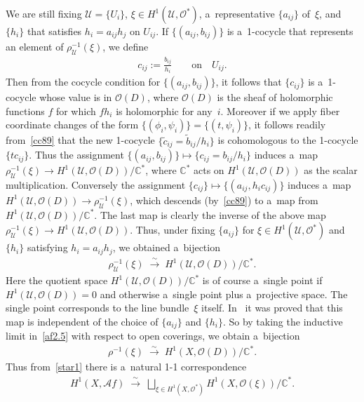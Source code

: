 We are still f\/ixing $\mathscr U=\{U_i\}$, $\xi \in H^1(\mathscr U,\mathscr O^*)$, a~representative $\{a_{ij}\}$ of~$\xi$,
and $\{h_i\}$ that satisf\/ies $h_i=a_{ij}h_j$ on $U_{ij}$.
If $\{(a_{ij},b_{ij})\}$ is a~1-cocycle that represents an element of $\rho^{-1}_{\mathscr U}(\xi)$, we def\/ine
\begin{gather*}
c_{ij}:= \frac{b_{ij}}{h_i}
\qquad
\text{on}
\quad
U_{ij}.
\end{gather*}
Then from the cocycle condition for $\{(a_{ij},b_{ij})\}$, it follows that $\{c_{ij}\}$ is a~1-cocycle whose value is in
$\mathscr O(D)$, where $\mathscr O(D)$ is the sheaf of holomorphic functions $f$ for which $fh_i$ is holomorphic for any~$i$.
Moreover if we apply f\/iber coordinate changes of the form $\{(\phi_i,\psi_i)\}=\{(t,\psi_i)\}$, it follows readily
from~\eqref{cc89} that the new 1-cocycle $\{\tilde c_{ij} = \tilde b_{ij}/h_i\}$ is cohomologous to the 1-cocycle
$\{tc_{ij}\}$.
Thus the assignment $\{(a_{ij},b_{ij})\} \mapsto \{c_{ij}=b_{ij}/h_i\}$ induces a~map $\rho_{\mathscr U}^{-1}(\xi)\to
H^1(\mathscr U,\mathscr O(D))/\mathbb{C}^*$, where $\mathbb{C}^*$ acts on $H^1(\mathscr U,\mathscr O(D))$ as the scalar
multiplication.
Conversely the assignment $\{c_{ij}\}\mapsto \{(a_{ij},h_ic_{ij})\}$ induces a~map $H^1(\mathscr U,\mathscr O(D))\to
\rho_{\mathscr U}^{-1}(\xi)$, which descends (by~\eqref{cc89}) to a~map from $H^1(\mathscr U,\mathscr
O(D))/\mathbb{C}^*$.
The last map is clearly the inverse of the above map $\rho_{\mathscr U}^{-1}(\xi)\to H^1(\mathscr U,\mathscr O(D))$.
Thus, under f\/ixing $\{a_{ij}\}$ for $\xi\in H^1(\mathscr U,\mathscr O^*)$ and $\{h_i\}$ satisfying $h_i = a_{ij}h_j$,
we obtained a~bijection
\begin{gather}
\label{af2.5}
\rho_{\mathscr U}^{-1}(\xi)
\; \stackrel{\sim}{\longrightarrow}
\;
H^1(\mathscr U,\mathscr O(D))/\mathbb{C}^*.
\end{gather}
Here the quotient space $H^1(\mathscr U,\mathscr O(D))/\mathbb{C}^*$ is of course a~single point if $H^1(\mathscr
U,\mathscr O(D))=0$ and otherwise a~single point plus a~projective space.
The single point corresponds to the line bundle~$\xi$ itself.
In~\cite{At55} it was proved that this map is independent of the choice of $\{a_{ij}\}$ and $\{h_i\}$.
So by taking the inductive limit in~\eqref{af2.5} with respect to open coverings, we obtain a~bijection
\begin{gather*}%
\rho^{-1}(\xi)
\;\stackrel{\sim}{\longrightarrow}
\;
H^1(X,\mathscr O(D))/\mathbb{C}^*.
\end{gather*}
Thus from~\eqref{star1} there is a~natural 1-1 correspondence
\begin{gather}
\label{af3}
H^1(X,\mathscr Af)
\;\stackrel{\sim}{\longrightarrow}
\;
\bigsqcup_{\xi\in H^1(X,\mathscr O^*)} H^1(X, \mathscr O(\xi)) /\mathbb{C}^*.
\end{gather}

